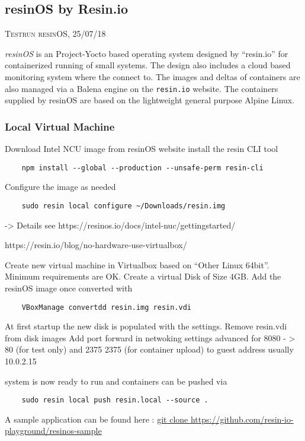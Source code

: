 \documentclass[]{scrartcl}
\begin{document}
\subsection{resinOS by Resin.io}

{\small\textsc{Testrun resinOS, 25/07/18} \bigskip}

\textit{resinOS} is an Project-Yocto based operating system designed by ``resin.io'' for containerized running of small systems. The design also includes a cloud based monitoring system where the connect to. The images and deltas of containers are also managed via a Balena engine on the \texttt{resin.io} website. The containers supplied by resinOS are based on the lightweight general purpose Alpine Linux.

\subsubsection{Local Virtual Machine}

Download Intel NCU image from resinOS website
install the resin CLI tool

\begin{verbatim}
	npm install --global --production --unsafe-perm resin-cli
\end{verbatim}
Configure the image as needed
\begin{verbatim}
	sudo resin local configure ~/Downloads/resin.img
\end{verbatim}
-> Details see https://resinos.io/docs/intel-nuc/gettingstarted/


https://resin.io/blog/no-hardware-use-virtualbox/

Create new virtual machine in Virtualbox based on ``Other Linux 64bit''. Minimum requirements are OK.
Create a virtual Disk of Size 4GB. Add the resinOS image once converted with 
\begin{verbatim}
	VBoxManage convertdd resin.img resin.vdi
\end{verbatim}
At first startup the new disk is populated with the settings. Remove resin.vdi from disk images
Add port forward in netwoking settings advanced for 8080 - > 80 (for test only) and 2375 2375 (for container upload) to guest address usually 10.0.2.15

system is now ready to run and containers can be pushed via 
\begin{verbatim}
	sudo resin local push resin.local --source .
\end{verbatim}

A sample application can be found here : \url{git clone https://github.com/resin-io-playground/resinos-sample}
\end{document}
